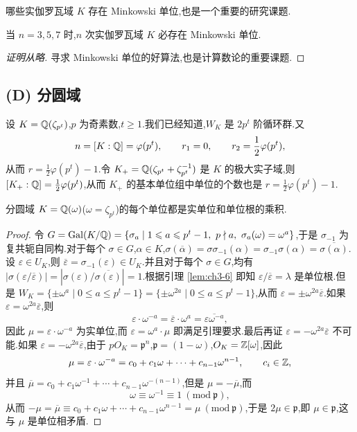哪些实伽罗瓦域 $K$ 存在 Minkowski 单位,也是一个重要的研究课题.

\begin{lemma}\label{lem:ch3-14}
当 $n=3,5,7$ 时,$n$ 次实伽罗瓦域 $K$ 必存在 Minkowski 单位.
\end{lemma}

\begin{proof}[证明从略]
寻求 Minkowski 单位的好算法,也是计算数论的重要课题.
\end{proof}

\subsection*{(D) 分圆域}

设 $K=\mathbb{Q}(\zeta_{p^t})$,$p$ 为奇素数,$t\geqslant 1$.我们已经知道,$W_K$ 是 $2p^t$ 阶循环群.又
\[
  n=[K:\mathbb{Q}]=\varphi(p^t),\qquad r_1=0,\qquad r_2=\frac{1}{2}\varphi(p^t),
\]
从而 $r=\frac{1}{2}\varphi(p^t)-1$.令 $K_+=\mathbb{Q}(\zeta_{p^t}+\zeta_{p^t}^{-1})$ 是 $K$ 的极大实子域,则 $[K_+:\mathbb{Q}]=\frac{1}{2}\varphi(p^t)$,从而 $K_+$ 的基本单位组中单位的个数也是 $r=\frac{1}{2}\varphi(p^t)-1$.

\begin{lemma}\label{lem:ch3-15}
分圆域 $K=\mathbb{Q}(\omega)$($\omega=\zeta_{p^t}$)的每个单位都是实单位和单位根的乘积.
\end{lemma}

\begin{proof}
令 $G=\operatorname{Gal}(K/\mathbb{Q})=\{\sigma_a\mid 1\leqslant a\leqslant p^t-1,\ p\nmid a,\ \sigma_a(\omega)=\omega^a\}$,于是 $\sigma_{-1}$ 为复共轭自同构.对于每个 $\sigma\in G$,$\alpha\in K$,$\sigma(\overline{\alpha})=\sigma\sigma_{-1}(\alpha)=\sigma_{-1}\sigma(\alpha)=\overline{\sigma(\alpha)}$.设 $\varepsilon\in U_K$,则 $\overline{\varepsilon}=\sigma_{-1}(\varepsilon)\in U_K$.并且对于每个 $\sigma\in G$,均有 $|\sigma(\varepsilon/\overline{\varepsilon})|=|\sigma(\varepsilon)/\overline{\sigma(\varepsilon)}|=1$.根据引理 \ref{lem:ch3-6} 即知 $\varepsilon/\overline{\varepsilon}=\lambda$ 是单位根.但是 $W_K=\{\pm\omega^a\mid 0\leqslant a\leqslant p^t-1\}=\{\pm\omega^{2a}\mid 0\leqslant a\leqslant p^t-1\}$,从而 $\varepsilon=\pm\omega^{2a}\overline{\varepsilon}$.如果 $\varepsilon=\omega^{2a}\overline{\varepsilon}$,则
\[
  \varepsilon\cdot\omega^{-a}=\overline{\varepsilon}\cdot\omega^a=\overline{\varepsilon\omega^{-a}},
\]
因此 $\mu=\varepsilon\cdot\omega^{-a}$ 为实单位,而 $\varepsilon=\omega^a\cdot\mu$ 即满足引理要求.最后再证 $\varepsilon=-\omega^{2a}\overline{\varepsilon}$ 不可能.如果 $\varepsilon=-\omega^{2a}\overline{\varepsilon}$,由于 $pO_K=\mathfrak{p}^n$,$\mathfrak{p}=(1-\omega)$,$O_K=\mathbb{Z}[\omega]$,因此
\[
  \mu=\varepsilon\cdot\omega^{-a}=c_0+c_1\omega+\cdots+c_{n-1}\omega^{n-1},\qquad c_i\in\mathbb{Z},
\]
并且 $\overline{\mu}=c_0+c_1\omega^{-1}+\cdots+c_{n-1}\omega^{-(n-1)}$,但是 $\mu=-\overline{\mu}$,而
\[
  \omega\equiv\omega^{-1}\equiv 1\ (\mathrm{mod}\ \mathfrak{p}),
\]
从而 $-\mu=\overline{\mu}\equiv c_0+c_1\omega+\cdots+c_{n-1}\omega^{n-1}=\mu\ (\mathrm{mod}\ \mathfrak{p})$,于是 $2\mu\in\mathfrak{p}$,即 $\mu\in\mathfrak{p}$,这与 $\mu$ 是单位相矛盾.
\end{proof}

